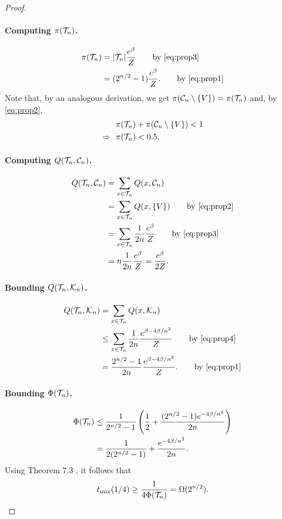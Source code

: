 \begin{proof}
\paragraph{Computing $\pi(\mathcal{T}_n)$.}
\begin{align*}
  \pi(\htn) &= |\htn| \frac{e^{\beta}}{Z} \tag*{by \eqref{eq:prop3}} \\
         &= (2^{n/2} - 1) \frac{e^{\beta}}{Z}. \tag*{by \eqref{eq:prop1}}
\end{align*}
Note that, by an analogous derivation, we get $\pi(\mathcal{C}_n \setminus \{V\}) = \pi(\mathcal{T}_n)$ and, by \eqref{eq:prop2},
\begin{align*}
  &\pi(\mathcal{T}_n) + \pi(\mathcal{C}_n \setminus \{V\}) < 1 \\
  \Rightarrow\ \ &\pi(\mathcal{T}_n) < 0.5.
\end{align*}
  
\paragraph{Computing $Q(\mathcal{T}_n, \mathcal{C}_n)$.}
\begin{align*}
  Q(\htn, \hcn) &= \sum_{x \in \htn} Q(x, \hcn) \\
                &= \sum_{x \in \htn} Q(x, \{V\}) \tag*{by \eqref{eq:prop2}} \\
                &= \sum_{x \in \htn} \frac{1}{2n} \frac{e^{\beta}}{Z} \tag*{by \eqref{eq:prop3}} \\
                &= n \frac{1}{2n} \frac{e^{\beta}}{Z} = \frac{e^{\beta}}{2Z}.
\end{align*}
    
\paragraph{Bounding $Q(\mathcal{T}_n, \mathcal{K}_n)$.}
\begin{align*}
  Q(\htn, \hkn) &= \sum_{x \in \htn} Q(x, \hkn) \\
                &\leq \sum_{x \in \htn} \frac{1}{2n} \frac{e^{\beta - 4\beta/n^2}}{Z} \tag*{by \eqref{eq:prop4}} \\
                &= \frac{2^{n/2} - 1}{2n} \frac{e^{\beta - 4\beta/n^2}}{Z}. \tag*{by \eqref{eq:prop1}}
\end{align*}

\paragraph{Bounding $\Phi(\mathcal{T}_n)$.}
\begin{align*}
  \Phi(\mathcal{T}_n) &\leq \frac{1}{2^{n/2} - 1}\left(\frac{1}{2} + \frac{(2^{n/2} - 1) e^{-4\beta/n^2}}{2n}\right)\\
          &= \frac{1}{2(2^{n/2} - 1)} + \frac{e^{-4\beta/n^2}}{2n}.
\end{align*}
Using Theorem 7.3 \citep{levin08book}, it follows that
\begin{align*}
  t_{\mathrm{mix}}(1/4) \geq \frac{1}{4\Phi(\mathcal{T}_n)} = \Omega(2^{n/2}).
\end{align*}

\end{proof}

